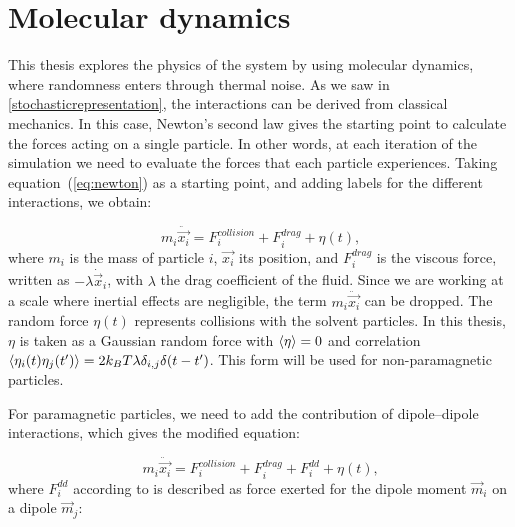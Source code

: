 \section{Molecular dynamics}



This thesis explores the physics of the system by using molecular dynamics, where randomness enters through thermal noise. As we saw in \ref{stochasticrepresentation}, the interactions can be derived from classical mechanics. In this case, Newton’s second law gives the starting point to calculate the forces acting on a single particle. In other words, at each iteration of the simulation we need to evaluate the forces that each particle experiences. Taking equation~(\ref{eq:newton}) as a starting point, and adding labels for the different interactions, we obtain:

\begin{equation}
  m_i\ddot{\vec{x_i}} = F^{collision}_i + F^{drag}_i + \eta(t)\text{,}
  \label{eq:langevinratchet}
\end{equation}
where $m_i$ is the mass of particle $i$, $\vec{x_i}$ its position, and $F^{drag}_i$ is the viscous force, written as $-\lambda \dot{\vec{x}}_i$, with $\lambda$ the drag coefficient of the fluid. Since we are working at a scale where inertial effects are negligible, the term $m_i\ddot{\vec{x_i}}$ can be dropped. The random force $\eta(t)$ represents collisions with the solvent particles. In this thesis, $\eta$ is taken as a Gaussian random force with $\expval{\eta} = 0$ and correlation $\expval{\eta_i(t)\eta_j(t')} = 2k_B T \lambda \delta_{i,j}\delta(t-t')$. This form will be used for non-paramagnetic particles.

For paramagnetic particles, we need to add the contribution of dipole–dipole interactions, which gives the modified equation:

\begin{equation}
  m_i\ddot{\vec{x_i}} = F^{collision}_i + F^{drag}_i + F^{dd}_i + \eta(t)\text{,}
  \label{eq:langevindipole}
\end{equation}
where $F^{dd}_i$ according to \cite{yung1998analytic} is described as force exerted for the dipole moment $\vec{m}_i$ on a dipole $\vec{m}_j$:

